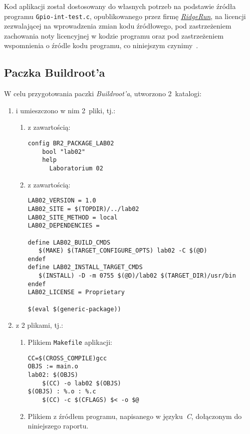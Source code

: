 \documentclass{article}
\begin{document}
\begin{sloppypar}
Kod aplikacji został dostosowany do własnych potrzeb na podstawie źródła programu \texttt{Gpio-int-test.c}, opublikowanego przez firmę \href{http://www.ridgerun.com/}{\emph{RidgeRun}}, na licencji zezwalającej na wprowadzenia zmian kodu źródłowego, pod zastrzeżeniem zachowania noty licencyjnej w kodzie programu oraz pod zastrzeżeniem wspomnienia o źródle kodu programu, co niniejszym czynimy~\cite{www:code}.
\end{sloppypar}


\subsection{Paczka Buildroot'a}
\label{brpackage}

W celu przygotowania paczki \emph{Buildroot'a}, utworzono 2~katalogi:
\begin{enumerate}
\item {} i umieszczono w nim 2~pliki, tj.:
\begin{enumerate}
\item {} z zawartością:
\begin{Verbatim}[frame=single]
config BR2_PACKAGE_LAB02
	bool "lab02"
	help
	  Laboratorium 02
\end{Verbatim}
\item {} z zawartością:
\begin{Verbatim}[frame=single]
LAB02_VERSION = 1.0
LAB02_SITE = $(TOPDIR)/../lab02
LAB02_SITE_METHOD = local
LAB02_DEPENDENCIES = 

define LAB02_BUILD_CMDS
   $(MAKE) $(TARGET_CONFIGURE_OPTS) lab02 -C $(@D)
endef
define LAB02_INSTALL_TARGET_CMDS
   $(INSTALL) -D -m 0755 $(@D)/lab02 $(TARGET_DIR)/usr/bin
endef
LAB02_LICENSE = Proprietary

$(eval $(generic-package))
\end{Verbatim}
\end{enumerate}
\item {} z 2 plikami, tj.:
\begin{enumerate}
\item Plikiem \texttt{Makefile} aplikacji:
\begin{Verbatim}[frame=single]
CC=$(CROSS_COMPILE)gcc
OBJS := main.o
lab02: $(OBJS)
	$(CC) -o lab02 $(OBJS)
$(OBJS) : %.o : %.c
	$(CC) -c $(CFLAGS) $< -o $@
\end{Verbatim}
\item Plikiem  z źródłem programu, napisanego w języku~\emph{C}, dołączonym do niniejszego raportu.
\end{enumerate}
\end{enumerate}
\end{document}
